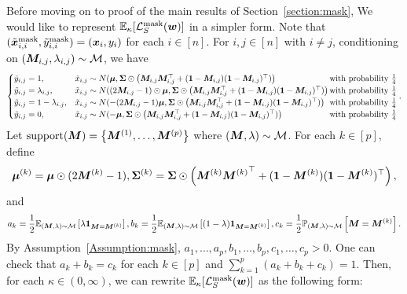 Before moving on to proof of the main results of Section~\ref{section:mask}, We would like to represent $\mathbb{E}_\kappa [ \mathcal{L}_S^\mathrm{mask} ( {\bm{w}} )]$ in a simpler form. Note that $(\tilde{{\bm{x}}}_{i,i}^\mathrm{mask},\tilde{y}_{i,i}^\mathrm{mask}) = ({\bm{x}}_i, y_i)$ for each $i \in [n]$. For $i,j \in [n]$ with $i \neq j$, conditioning on $({\bm{M}}_{i,j}, \lambda_{i,j}) \sim \mathcal{M}$, we have
\begin{align*}
    \begin{cases}
    \tilde{y}_{i,j} = 1,   &\tilde{x}_{i,j}\sim N(\vmu, \mSigma \odot \left(\mM_{i,j}\mM_{i,j}^\top + (\vone-\mM_{i,j})(\vone-\mM_{i,j})^\top )\right) \hfill\text{with probability }\frac{1}{4}\\
    \tilde{y}_{i,j} = \lambda_{i,j}, &\tilde{x}_{i,j} \sim N((2\mM_{i,j}-1)\odot\vmu, \mSigma \odot \left(\mM_{i,j}\mM_{i,j}^\top + (\vone-\mM_{i,j})(\vone-\mM_{i,j})^\top )\right)\hfill\text{with probability } \frac{1}{4}\\
    \tilde{y}_{i,j} = 1-\lambda_{i,j},  &\tilde{x}_{i,j}\sim N(-(2\mM_{i,j}-1)\vmu, \mSigma \odot \left(\mM_{i,j}\mM_{i,j}^\top + (\vone-\mM_{i,j})(\vone-\mM_{i,j})^\top )\right)\hfill\text{with probability }\frac{1}{4}\\
    \tilde{y}_{i,j} = 0,  &\tilde{x}_{i,j}\sim N(-\vmu, \mSigma \odot \left(\mM_{i,j}\mM_{i,j}^\top + (\vone-\mM_{i,j})(\vone-\mM_{i,j})^\top )\right) \hfill\text{with probability } \frac{1}{4}
    \end{cases}.
\end{align*}
Let $ \mathrm{support}({\bm{M}}) = \left \{ {\bm{M}}^{(1)}, \dots, {\bm{M}}^{(p)} \right \} $ where $({\bm{M}}, \lambda ) \sim \mathcal{M} $. For each $k \in [p]$, define 
\begin{equation*}
{\bm{\mu}}^{(k)} = {\bm{\mu}} \odot (2{\bm{M}}^{(k)}-1), {\bm{\Sigma}}^{(k)} = {\bm{\Sigma}} \odot \left({\bm{M}}^{(k)}{{\bm{M}}^{(k)}}^\top + ({\bm{1}}-{\bm{M}}^{(k)})({\bm{1}}-{\bm{M}}^{(k)})^\top\right),
\end{equation*}
and
\begin{equation*}
a_k = \frac{1}{2}\mathbb{E}_{({\bm{M}},\lambda) \sim \mathcal{M}}\left[\lambda{\bm{1}}_{{\bm{M}} = {\bm{M}}^{(k)}}\right], b_k = \frac{1}{2}\mathbb{E}_{({\bm{M}},\lambda) \sim \mathcal{M}}\left[(1-\lambda){\bm{1}}_{{\bm{M}} = {\bm{M}}^{(k)}}\right],c_k = \frac{1}{2} \mathbb{P}_{({\bm{M}}, \lambda) \sim \mathcal{M}}\left[{\bm{M}} = {\bm{M}}^{(k)} \right].
\end{equation*}
By Assumption~\ref{Assumption:mask}, $a_1, \dots, a_p, b_1, \dots, b_p, c_1, \dots, c_p>0$. One can check that $a_k + b_k = c_k$ for each $k \in [p]$ and $\sum_{k=1}^p (a_k + b_k + c_k) = 1$.  Then, for each $\kappa\in (0,\infty)$, we can rewrite $\mathbb{E}_\kappa [\mathcal{L}_S^\mathrm{mask} ({\bm{w}})]$ as the following form:
